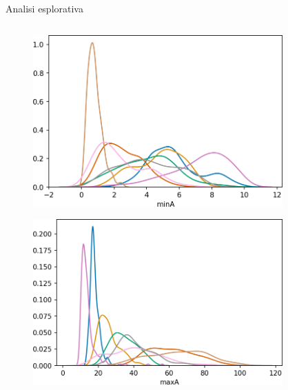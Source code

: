 \documentclass{beamer}
\begin{document}
\begin{frame}{Analisi esplorativa}
\begin{columns}[T] %
\begin{column}{.33\textwidth}
\begin{figure}[H]
\includegraphics[width=\textwidth]{../figure/minA.png}
\end{figure}
\begin{figure}[H]
\includegraphics[width=\textwidth]{../figure/maxA.png}
\end{figure}
\end{column}%
\hfill%
\begin{column}{.33\textwidth}
\begin{figure}[H]

\end{figure}
\end{column}
\end{columns}
\end{frame}
\end{document}
